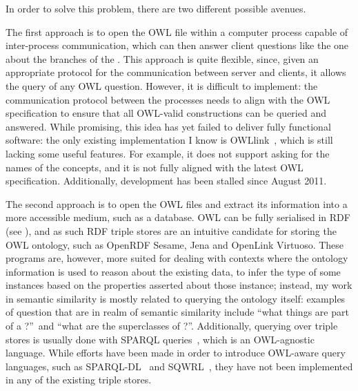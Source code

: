 In order to solve this problem, there are two different possible avenues.

The first approach is to open the OWL file within a computer process capable of inter-process communication, which can then answer client questions like the one about the branches of the . This approach is quite flexible, since, given an appropriate protocol for the communication between server and clients, it allows the query of any OWL question. However, it is difficult to implement: the communication protocol between the processes needs to align with the OWL specification to ensure that all OWL-valid constructions can be queried and answered. While promising, this idea has yet failed to deliver fully functional software: the only existing implementation I know is OWLlink~\citep{Liebig2009}, which is still lacking some useful features. For example, it does not support asking for the names of the concepts, and it is not fully aligned with the latest OWL specification. Additionally, development has been stalled since August 2011.

The second approach is to open the OWL files and extract its information into a more accessible medium, such as a database. OWL can be fully serialised in RDF (see ), and as such RDF triple stores are an intuitive candidate for storing the OWL ontology, such as OpenRDF Sesame, Jena and OpenLink Virtuoso. These programs are, however, more suited for dealing with contexts where the ontology information is used to reason about the existing data, \eg to infer the type of some instances based on the properties asserted about those instance; instead, my work in semantic similarity is mostly related to querying the ontology itself: examples of question that are in realm of semantic similarity include ``what things are part of a ?''\ and ``what are the superclasses of ?''. Additionally, querying over triple stores is usually done with SPARQL queries~\citep{Harris2013}, which is an OWL-agnostic language. While efforts have been made in order to introduce OWL-aware query languages, such as SPARQL-DL~\citep{Sirin2007} and SQWRL~\citep{OConnor2009}, they have not been implemented in any of the existing triple stores.


